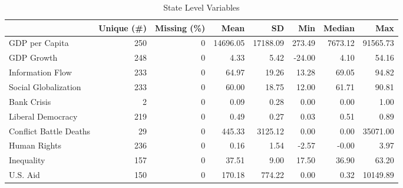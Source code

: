 \begin{table}

\caption{State Level Variables}
\centering
\begin{tabular}[t]{lrrrrrrr}
\toprule
  & Unique (\#) & Missing (\%) & Mean & SD & Min & Median & Max\\
\midrule
GDP per Capita & 250 & 0 & 14696.05 & 17188.09 & 273.49 & 7673.12 & 91565.73\\
GDP Growth & 248 & 0 & 4.33 & 5.42 & -24.00 & 4.10 & 54.16\\
Information Flow & 233 & 0 & 64.97 & 19.26 & 13.28 & 69.05 & 94.82\\
Social Globalization & 233 & 0 & 60.00 & 18.75 & 12.00 & 61.71 & 90.81\\
Bank Crisis & 2 & 0 & 0.09 & 0.28 & 0.00 & 0.00 & 1.00\\
Liberal Democracy & 219 & 0 & 0.49 & 0.27 & 0.03 & 0.51 & 0.89\\
Conflict Battle Deaths & 29 & 0 & 445.33 & 3125.12 & 0.00 & 0.00 & 35071.00\\
Human Rights & 236 & 0 & 0.16 & 1.54 & -2.57 & -0.00 & 3.97\\
Inequality & 157 & 0 & 37.51 & 9.00 & 17.50 & 36.90 & 63.20\\
U.S. Aid & 150 & 0 & 170.18 & 774.22 & 0.00 & 0.32 & 10149.89\\
\bottomrule
\end{tabular}
\end{table}
